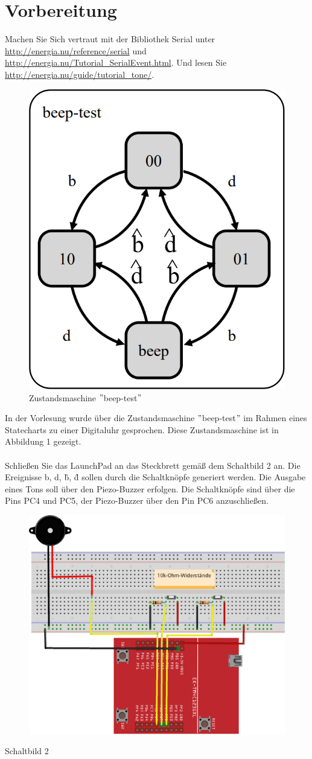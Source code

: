\newpage
\section{Vorbereitung}
Machen Sie Sich vertraut mit der Bibliothek Serial unter \url{http://energia.nu/reference/serial} und \url{http://energia.nu/Tutorial\_SerialEvent.html}. Und lesen Sie \url{http://energia.nu/guide/tutorial\_tone/}.\\
\begin{figure}[h]
\centering
\includegraphics[width=0.3\linewidth]{images/beep-test}
\caption{Zustandsmaschine $"$beep-test$"$}
\label{fig:beep-test}
\end{figure}

\noindent In der Vorlesung wurde über die Zustandsmaschine $"$beep-test$"$ im Rahmen eines Statecharts zu einer Digitaluhr gesprochen. Diese Zustandsmaschine ist in Abbildung 1 gezeigt.\\ \\
Schlie\ss{}en Sie das LaunchPad an das Steckbrett gemä\ss{} dem Schaltbild 2 an. Die Ereignisse b, d, \^b, \^d sollen durch die Schaltknöpfe generiert werden. Die Ausgabe eines Tons soll über den Piezo-Buzzer erfolgen. Die Schaltknöpfe sind über die Pins PC4 und PC5, der Piezo-Buzzer über den Pin PC6 anzuschlie\ss{}en.\\
\begin{figure}[h]
\centering
\includegraphics[width=0.5\linewidth]{images/Schaltbild2}
\label{fig:Schaltblid2}
\end{figure}
\begin{center}
	Schaltbild 2
\end{center}
\newpage
